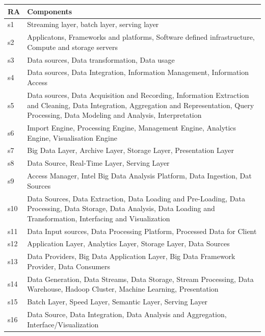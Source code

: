\documentclass[review]{elsarticle}
\begin{document}
\begin{longtable}{|p{0.5cm}|p{10cm}|}
        \hline
        RA & Components \\ 
        \hline
        s1 & Streaming layer, batch layer, serving layer   \\
        \hline
        s2 & Applicatons, Frameworks and platforms, Software defined infrastructure, Compute and storage servers  \\
        \hline
        s3 & Data sources, Data transformation, Data usage  \\
        \hline
        s4 & Data sources, Data Integration, Information Management, Information Access \\
        \hline
        s5 & Data sources, Data Acquisition and Recording, Information Extraction and Cleaning, Data Integration, Aggregation and Representation, Query Processing, Data Modeling and Analysis, Interpretation  \\
        \hline
        s6 & Import Engine, Processing Engine, Management Engine, Analytics Engine, Visualisation Engine  \\
        \hline
        s7 & Big Data Layer, Archive Layer, Storage Layer, Presentation Layer  \\
        \hline
        s8 & Data Source, Real-Time Layer, Serving Layer   \\
        \hline
        s9 & Access Manager, Intel Big Data Analysis Platform, Data Ingestion, Dat Sources  \\
        \hline
        s10 & Data Sources, Data Extraction, Data Loading and Pre-Loading, Data Processing, Data Storage, Data Analysis, Data Loading and Transformation, Interfacing and Visualization  \\
        \hline
        s11 & Data Input sources, Data Processing Platform, Processed Data for Client   \\
        \hline
        s12 & Application Layer, Analytics Layer, Storage Layer, Data Sources    \\
        \hline
        s13 & Data Providers, Big Data Application Layer, Big Data Framework Provider, Data Consumers \\
        \hline
        s14 & Data Generation, Data Streams, Data Storage, Stream Processing, Data Warehouse, Hadoop Cluster, Machine Learning, Presentation \\
        \hline
        s15 & Batch Layer, Speed Layer, Semantic Layer, Serving Layer \\
        \hline
        s16 & Data Source, Data Integration, Data Analysis and Aggregation, Interface/Visualization \\

\end{longtable}
\end{document}
